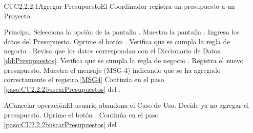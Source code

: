 	\begin{UseCase}{CUC2.2.2.1}{Agregar Presupuesto}{El Coordinador registra un presupuesto a un Proyecto.}
	\end{UseCase}

	\begin{UCtrayectoria}{Principal}
			\UCpaso[\UCactor] Selecciona la opción  de la pantalla .
			\UCpaso Muestra la pantalla .
			\UCpaso [\UCactor] Ingresa los datos del Presupuesto. \label{paso:CU2.2.2.1ingresaDatosPresupuesto}
			\UCpaso [\UCactor] Oprime el botón .
			\UCpaso Verifica que se cumpla la regla de negocio .  
			\UCpaso Revisa que los datos correspondan con el Diccionario de Datos. \ref{dd:Presupuestos}. 
			\UCpaso Verifica que se cumpla la regla de negocio .  
			\UCpaso Registra el nuevo presupuesto.
			\UCpaso Muestra el mensaje (MSG-4) indicando que se ha agregado correctamente el registro.\ref{MSG4}
			\UCpaso Continúa en el paso \ref{paso:CU2.2.2buscarPresupuestos} del .
	\end{UCtrayectoria}

	\begin{UCtrayectoriaA}{A}{Cancelar operación}{El usuario abandona el Caso de Uso.}
			\UCpaso[\UCactor] Decide ya no agregar el presupuesto.
			\UCpaso[\UCactor] Oprime el botón .
			\UCpaso Continúa en el paso \ref{paso:CU2.2.2buscarPresupuestos} del .
	\end{UCtrayectoriaA}
		
